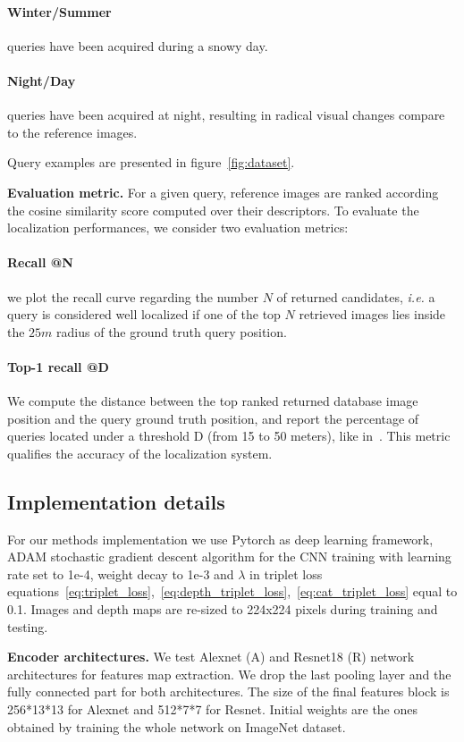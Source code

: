 	\paragraph{Winter/Summer} queries have been acquired during a snowy day.
	\paragraph{Night/Day} queries have been acquired at night, resulting in radical visual changes compare to the reference images.

Query examples are presented in figure~\ref{fig:dataset}.
	
\noindent\textbf{Evaluation metric.} For a given query, reference images are ranked according the cosine similarity score computed over their descriptors. To evaluate the localization performances, we consider two evaluation metrics:
	\setcounter{paragraph}{0}
	\paragraph{Recall @N} we plot the recall curve regarding the number $N$ of returned candidates, {\it i.e.} a query is considered well localized if one of the top $N$ retrieved images lies inside the $25m$ radius of the ground truth query position.
	\paragraph{Top-1 recall @D} We compute the distance between the top ranked returned database image position and the query ground truth position, and report the percentage of queries located under a threshold D (from 15 to 50 meters), like in~\cite{Zamir2014}. This metric qualifies the accuracy of the localization system.

\subsection{Implementation details}
\label{subsec:implementation}

For our methods implementation we use Pytorch as deep learning framework, ADAM stochastic gradient descent algorithm for the CNN training with learning rate set to 1e-4, weight decay to 1e-3 and $\lambda$ in triplet loss equations~\ref{eq:triplet_loss},~\ref{eq:depth_triplet_loss},~\ref{eq:cat_triplet_loss} equal to 0.1. Images and depth maps are re-sized to 224x224 pixels during training and testing.

\noindent\textbf{Encoder architectures.} We test Alexnet (A) and Resnet18 (R) network architectures for features map extraction. We drop the last pooling layer and the fully connected part for both architectures. The size of the final features block is 256*13*13 for Alexnet and 512*7*7 for Resnet. Initial weights are the ones obtained by training the whole network on ImageNet dataset.

